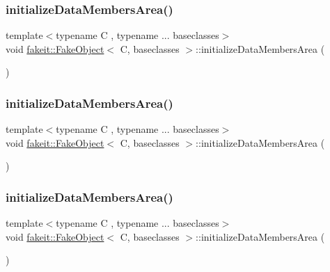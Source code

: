\subsubsection{\texorpdfstring{initializeDataMembersArea()}{initializeDataMembersArea()}\hspace{0.1cm}{\footnotesize\ttfamily [7/9]}}
{\footnotesize\ttfamily template$<$typename C , typename ... baseclasses$>$ \\
void \mbox{\hyperlink{classfakeit_1_1FakeObject}{fakeit\+::\+Fake\+Object}}$<$ C, baseclasses $>$\+::initialize\+Data\+Members\+Area (\begin{DoxyParamCaption}{ }\end{DoxyParamCaption})\hspace{0.3cm}{\ttfamily [inline]}}

\mbox{\label{classfakeit_1_1FakeObject_a894a7e1ef1e41cec0eb91cbb3d5c73cd}} 
\subsubsection{\texorpdfstring{initializeDataMembersArea()}{initializeDataMembersArea()}\hspace{0.1cm}{\footnotesize\ttfamily [8/9]}}
{\footnotesize\ttfamily template$<$typename C , typename ... baseclasses$>$ \\
void \mbox{\hyperlink{classfakeit_1_1FakeObject}{fakeit\+::\+Fake\+Object}}$<$ C, baseclasses $>$\+::initialize\+Data\+Members\+Area (\begin{DoxyParamCaption}{ }\end{DoxyParamCaption})\hspace{0.3cm}{\ttfamily [inline]}}

\mbox{\label{classfakeit_1_1FakeObject_a894a7e1ef1e41cec0eb91cbb3d5c73cd}} 
\subsubsection{\texorpdfstring{initializeDataMembersArea()}{initializeDataMembersArea()}\hspace{0.1cm}{\footnotesize\ttfamily [9/9]}}
{\footnotesize\ttfamily template$<$typename C , typename ... baseclasses$>$ \\
void \mbox{\hyperlink{classfakeit_1_1FakeObject}{fakeit\+::\+Fake\+Object}}$<$ C, baseclasses $>$\+::initialize\+Data\+Members\+Area (\begin{DoxyParamCaption}{ }\end{DoxyParamCaption})\hspace{0.3cm}{\ttfamily [inline]}}

